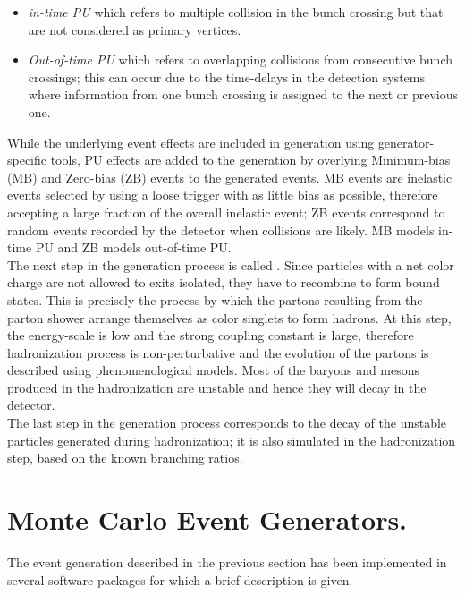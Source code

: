 \begin{itemize}
\item \textit{in-time PU} which refers to multiple \pp collision in the bunch crossing but that are not considered as primary vertices. 
\item \textit{Out-of-time PU} which refers to overlapping \pp collisions from consecutive bunch crossings; this can occur due to the time-delays in the detection systems where information from one bunch crossing is assigned to the next or previous one. 
\end{itemize}

\noindent While the underlying event effects are included in generation using generator-specific tools, PU effects are added to the generation by overlying Minimum-bias (MB) and Zero-bias (ZB) events to the generated events. MB events are inelastic events selected by using a loose trigger with as little bias as possible, therefore accepting a large fraction of the overall inelastic event; ZB events correspond to random events recorded by the detector when collisions are likely. MB models in-time PU and ZB models out-of-time PU.\\ 

\noindent The next step in the generation process is called . Since particles with a net color charge are not allowed to exits isolated, they have to recombine to form bound states. This is precisely the process by which the partons resulting from the parton shower arrange themselves as color singlets to form hadrons. At this step, the energy-scale is low and the strong coupling constant is large, therefore hadronization process is non-perturbative and the evolution of the partons is described using phenomenological models. Most of the baryons and mesons produced in the hadronization are unstable and hence they will decay in the detector.\\

\noindent The last step in the generation process corresponds to the decay of the unstable particles generated during hadronization; it is also simulated in the hadronization step, based on the known branching ratios. 

\section{Monte Carlo Event Generators.}

\noindent The event generation described in the previous section has been implemented in several software packages for which a brief description is given.     

